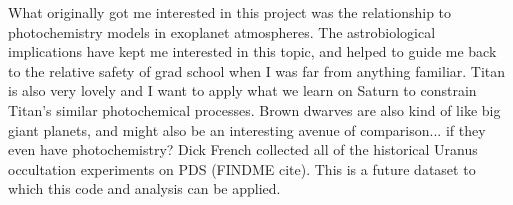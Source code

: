 \documentclass[12pt]{article}
\begin{document}
What originally got me interested in this project was the relationship to
photochemistry models in exoplanet atmospheres. The astrobiological
implications have kept me interested in this topic, and helped to guide me back
to the relative safety of grad school when I was far from anything familiar.
Titan is also very lovely and I want to apply what we learn on Saturn to
constrain Titan's similar photochemical processes. Brown dwarves are also kind
of like big giant planets, and might also be an interesting avenue of
comparison... if they even have photochemistry?  Dick French collected all of
the historical Uranus occultation experiments on PDS (FINDME cite). This is a
future dataset to which this code and analysis can be applied.
\end{document}
